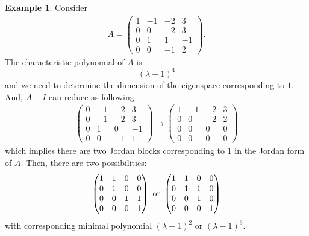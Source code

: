 \documentclass[11pt]{book}
\theoremstyle{definition}
\newtheorem{example}{Example}[section]
\numberwithin{equation}{chapter}
\begin{document}
\begin{example}
Consider
\begin{align*}
    A = \begin{pmatrix}
    1 & -1 & -2 & 3 \\
    0 & 0 & -2 & 3 \\
    0 & 1 & 1 & -1 \\
    0 & 0 & -1 & 2
    \end{pmatrix}.
\end{align*}
The characteristic polynomial of $A$ is 
$$(\lambda - 1)^4$$
and we need to determine the dimension of the eigenspace corresponding to $1$. And, $A - I$ can reduce as following
\begin{align*}
    \begin{pmatrix}
    0 & -1 & -2 & 3 \\
    0 & -1 & -2 & 3 \\
    0 & 1 & 0 & -1 \\
    0 & 0 & -1 & 1
    \end{pmatrix} \to \begin{pmatrix}
    1 & -1 & -2 & 3 \\
    0 & 0 & -2 & 2 \\
    0 & 0 & 0 & 0 \\
    0 & 0 & 0 & 0
    \end{pmatrix}
\end{align*}
which implies there are two Jordan blocks corresponding to $1$ in the Jordan form of $A$. Then, there are two possibilities:
\begin{align*}
    \begin{pmatrix}
    1 & 1 & 0 & 0 \\
    0 & 1 & 0 & 0 \\
    0 & 0 & 1 & 1 \\
    0 & 0 & 0 & 1
    \end{pmatrix}\,\, {\rm or}\,\, \begin{pmatrix}
    1 & 1 & 0 & 0 \\
    0 & 1 & 1 & 0 \\
    0 & 0 & 1 & 0 \\
    0 & 0 & 0 & 1
    \end{pmatrix}
\end{align*}
with corresponding minimal polynomial $(\lambda - 1)^2$ or $(\lambda - 1)^3$.


\end{example}
\end{document}
